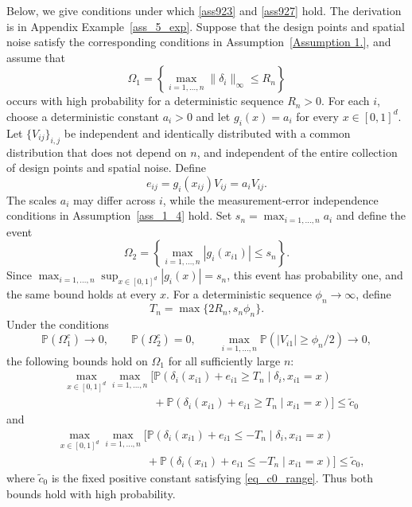 \documentclass[twoside,11pt]{article}
\newenvironment{revision}{\color{revisionred}}{}
\begin{document}
\begin{example}\label{exp_tail}
\begin{revision}
Below, we give conditions under which \eqref{ass923} and \eqref{ass927} hold. The derivation is in Appendix Example~\ref{ass_5_exp}.
Suppose that the design points and spatial noise satisfy the corresponding conditions in Assumption~\ref{Assumption 1.}, and assume that
\[
\Omega_1=\left\{\max_{i=1,\dots,n}\|\delta_i\|_{\infty}\leq R_n\right\}
\]
occurs with high probability for a deterministic sequence $R_n>0$.
For each $i$, choose a deterministic constant $a_i>0$ and let $g_i(x)=a_i$ for every $x\in[0,1]^d$. Let $\{V_{ij}\}_{i,j}$ be independent and identically distributed with a common distribution that does not depend on $n$, and independent of the entire collection of design points and spatial noise. Define
\[
e_{ij}=g_i(x_{ij})V_{ij}=a_iV_{ij}.
\]
The scales $a_i$ may differ across $i$, while the measurement-error independence conditions in Assumption~\ref{ass_1_4} hold.
Set $s_n=\max_{i=1,\dots,n}a_i$ and define the event
\[
\Omega_2=\left\{\max_{i=1,\dots,n}|g_i(x_{i1})|\leq s_n\right\}.
\]
Since $\max_{i=1,\dots,n}\sup_{x\in[0,1]^d}|g_i(x)|=s_n$, this event has probability one, and the same bound holds at every $x$.
For a deterministic sequence $\phi_n\to\infty$, define
\[
T_n=\max\{2R_n,s_n\phi_n\}.
\]
Under the conditions
\begin{equation}
\label{exp2_cond}
\mathbb{P}(\Omega_1^c)\to0,\qquad
\mathbb{P}(\Omega_2^c)=0,\qquad
\max_{i=1,\dots,n}\mathbb{P}(|V_{i1}|\geq\phi_n/2)\to0,
\end{equation}
the following bounds hold on $\Omega_1$ for all sufficiently large $n$:
\begin{align*}
&\max_{x\in[0,1]^d}\max_{i=1,\dots,n}
\bigg[
\mathbb{P}\left(\delta_i(x_{i1})+e_{i1}\geq T_n
\mid\delta_i,x_{i1}=x\right)\\
&\qquad\qquad\qquad\qquad
+\mathbb{P}\left(\delta_i(x_{i1})+e_{i1}\geq T_n
\mid x_{i1}=x\right)
\bigg]\leq\tilde c_0
\end{align*}
and
\begin{align*}
&\max_{x\in[0,1]^d}\max_{i=1,\dots,n}
\bigg[
\mathbb{P}\left(\delta_i(x_{i1})+e_{i1}\leq -T_n
\mid\delta_i,x_{i1}=x\right)\\
&\qquad\qquad\qquad\qquad
+\mathbb{P}\left(\delta_i(x_{i1})+e_{i1}\leq -T_n
\mid x_{i1}=x\right)
\bigg]\leq\tilde c_0,
\end{align*}
where $\tilde c_0$ is the fixed positive constant satisfying \eqref{eq_c0_range}. Thus both bounds hold with high probability.


\end{revision}
\end{example}
\end{document}
